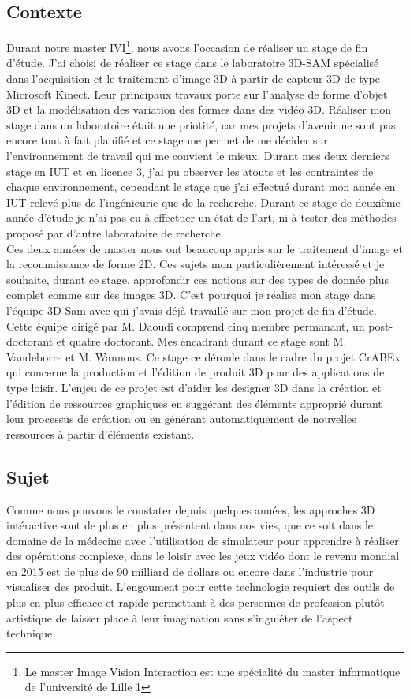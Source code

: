 \subsection{Contexte}
Durant notre master IVI\footnote{Le master Image Vision Interaction est 
une spécialité du master informatique de l'université de Lille 1}, 
nous avons l'occasion de réaliser un stage de fin d'étude. J'ai choisi de réaliser ce stage
dans le laboratoire 3D-SAM spécialisé dans l'acquisition et le traitement d'image 3D 
à partir de capteur 3D de type Microsoft Kinect. Leur principaux travaux porte sur
l'analyse de forme d'objet 3D et la modélisation des variation des formes dans des
vidéo 3D. Réaliser mon stage dans un laboratoire était une priotité, car mes projets d'avenir
ne sont pas encore tout à fait planifié et ce stage me permet de me décider sur l'environnement
de travail qui me convient le mieux. Durant mes deux derniers stage en IUT et en licence 3, j'ai pu
observer les atouts et les contraintes de chaque environnement, cependant le stage que j'ai effectué 
durant mon année en IUT relevé plus de l'ingénieurie que de la recherche. Durant ce stage de deuxième
année d'étude je n'ai pas eu à effectuer un état de l'art, ni à tester des méthodes proposé par 
d'autre laboratoire de recherche.\\

Ces deux années de master nous ont beaucoup appris sur le traitement d'image et la reconnaissance de 
forme 2D. Ces sujets mon particulièrement intéressé et je souhaite, durant ce stage, approfondir ces
notions sur des types de donnée plus complet comme sur des images 3D. C'est pourquoi je réalise mon
stage dans l'équipe 3D-Sam avec qui j'avais déjà travaillé sur mon projet de fin d'étude. Cette équipe
dirigé par M. Daoudi comprend cinq membre permanant, un post-doctorant et quatre doctorant. Mes 
encadrant durant ce stage sont M. Vandeborre et M. Wannous. Ce stage ce déroule dans le cadre du
projet CrABEx qui concerne la production et l'édition de produit 3D pour des applications de type
loisir. L'enjeu de ce projet est d'aider les designer 3D dans la création et l'édition de ressources
graphiques en suggérant des éléments approprié durant leur processus de création ou en générant automatiquement 
de nouvelles ressources à partir d'éléments existant.

\subsection{Sujet}
Comme nous pouvons le constater depuis quelques années, les approches 3D intéractive sont de plus en plus 
présentent dans nos vies, que ce soit dans le domaine de la médecine avec l'utilisation de simulateur
pour apprendre à réaliser des opérations complexe, dans le loisir avec les jeux vidéo dont le revenu
mondial en 2015 est de plus de 90 milliard de dollars ou encore dans l'industrie pour visualiser des produit.
L'engoument pour cette technologie requiert des outils de plus en plus efficace et rapide permettant à
des personnes de profession plutôt artistique de laisser place à leur imagination sans s'inguiéter de 
l'aspect technique.\\

